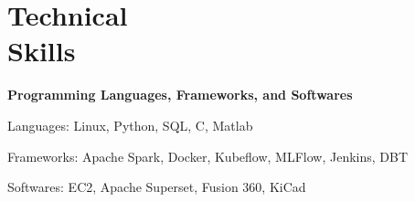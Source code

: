 \section{\mysidestyle Technical\\Skills}
\textbf{Programming Languages, Frameworks, and Softwares}
\begin{list2}
    \item{Languages: Linux, Python, SQL, C, Matlab}
    \item{Frameworks: Apache Spark, Docker, Kubeflow, MLFlow, Jenkins, DBT}
    \item{Softwares: EC2, Apache Superset, Fusion 360, KiCad}
\end{list2}